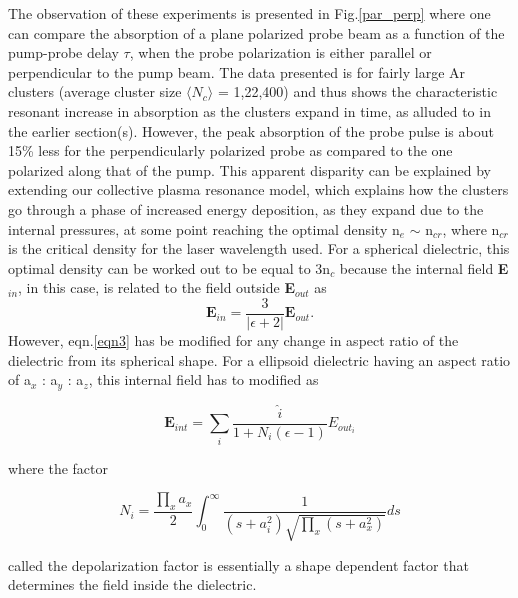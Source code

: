 \documentclass[a4paper,12pt]{article}
\begin{document}
The observation of these experiments is presented in Fig.\ref{par_perp} where one can compare the absorption of a plane polarized probe beam as a function of the pump-probe delay $\tau$, when the probe polarization is either parallel or perpendicular to the pump beam. The data presented is for fairly large Ar clusters (average cluster size $\langle N_{c} \rangle$ = 1,22,400) and thus shows the characteristic resonant increase in absorption as the clusters expand in time, as alluded to in the earlier section(s). However, the peak absorption of the probe pulse is about 15\% less for the perpendicularly polarized probe as compared to the one polarized along that of the pump. This apparent disparity can be explained by extending our collective plasma resonance model, which explains how the clusters go through a phase of increased energy deposition, as they expand due to the internal pressures, at some point reaching the optimal density n$_{e}$ $\sim$ n$_{cr}$, where n$_{cr}$ is the critical density for the laser wavelength used. For a spherical dielectric, this optimal density can be worked out to be equal to 3n$_{c}$ because the internal field \textbf{E}$_{in}$, in this case, is related to the field outside \textbf{E}$_{out}$ as
\begin{equation}\label{eqn3}
\textbf{E}_{in}=\frac{3}{|\epsilon+2|}\textbf{E}_{out}.
\end{equation}
However, eqn.\ref{eqn3} has be modified for any change in aspect ratio of the dielectric from its spherical shape. For a ellipsoid dielectric having an aspect ratio of a\(_{x}\) : a\(_{y}\) : a\(_{z}\), this internal field has to modified as

\begin{equation}\label{eqn4}
        {\textbf{E}}_{int}=\sum_{i}\frac{\hat{i}}{1+N_{i}(\epsilon-1)}E_{out_i}
\end{equation}

where the factor

\begin{equation}\label{eqn5}
    N_{i}=\frac{\prod_{x}a_{x}}{2}\int_{0}^{\infty} \frac{1}{(s+a_{i}^{2})\sqrt{\prod_{x}(s+a_{x}^{2})}}ds
\end{equation}

called the depolarization factor is essentially a shape dependent factor that determines the field inside the dielectric\cite{landau}.
\end{document}
